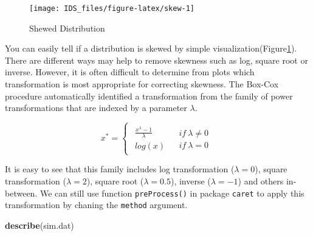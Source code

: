 \documentclass[12pt,]{krantz}
\newenvironment{Shaded}{\begin{snugshade}}{\end{snugshade}}
\newcommand{\KeywordTok}[1]{\textcolor[rgb]{0.13,0.29,0.53}{\textbf{{#1}}}}
\newcommand{\NormalTok}[1]{{#1}}
\theoremstyle{definition}
\theoremstyle{definition}
\theoremstyle{remark}
\begin{document}
\begin{figure}

{\centering \texttt{[image: IDS\_files/figure-latex/skew-1]} 

}

\caption{Shewed Distribution}\label{fig:skew}
\end{figure}

You can easily tell if a distribution is skewed by simple
visualization(Figure\ref{fig:skew}). There are different ways may help
to remove skewness such as log, square root or inverse. However, it is
often difficult to determine from plots which transformation is most
appropriate for correcting skewness. The Box-Cox procedure automatically
identified a transformation from the family of power transformations
that are indexed by a parameter \(\lambda\)\citep{BOXCOX1}.

\[
x^{*}=\begin{cases}
\begin{array}{c}
\frac{x^{\lambda}-1}{\lambda}\\
log(x)
\end{array} & \begin{array}{c}
if\ \lambda\neq0\\
if\ \lambda=0
\end{array}\end{cases}
\]

It is easy to see that this family includes log transformation
(\(\lambda=0\)), square transformation (\(\lambda=2\)), square root
(\(\lambda=0.5\)), inverse (\(\lambda=-1\)) and others in-between. We
can still use function \texttt{preProcess()} in package \texttt{caret}
to apply this transformation by chaning the \texttt{method} argument.

\begin{Shaded}
\begin{Highlighting}[]
\KeywordTok{describe}\NormalTok{(sim.dat)}
\end{Highlighting}
\end{Shaded}
\end{document}
